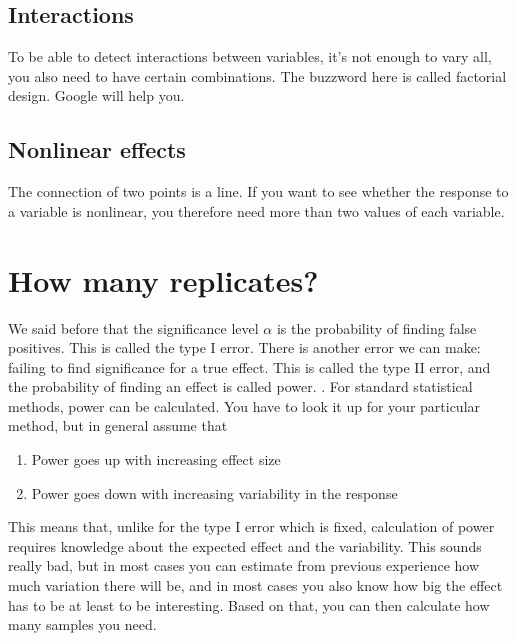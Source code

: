 \documentclass[a4paper,twoside]{tufte-book} %
\begin{document}
\subsection{Interactions}

To be able to detect interactions between variables, it's not enough to vary all, you also need to have certain combinations. The buzzword here is called factorial design. Google will help you.

\subsection{Nonlinear effects}

The connection of two points is a line. If you want to see whether the response to a variable is nonlinear, you therefore need more than two values of each variable.  


\section{How many replicates?}

We said before that the significance level $\alpha$ is the probability of finding false positives. This is called the type I error. There is another error we can make: failing to find significance for a true effect. This is called the type II error, and the probability of finding an effect is called power. . For standard statistical methods, power can be calculated. You have to look it up for your particular method, but in general assume that 

\begin{enumerate}
\item Power goes up with increasing effect size
\item Power goes down with increasing variability in the response
\end{enumerate}

This means that, unlike for the type I error which is fixed, calculation of power requires knowledge about the expected effect and the variability. This sounds really bad, but in most cases you can estimate from previous experience how much variation there will be, and in most cases you also know how big the effect has to be at least to be interesting. Based on that, you can then calculate how many samples you need. 






 
\end{document}
